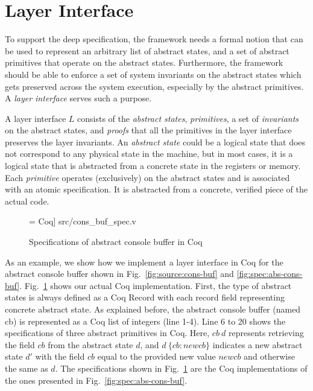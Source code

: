 \section{Layer Interface}
\label{sec:layer_interface}
To support the deep specification, the framework needs a formal notion
that can be used to represent an arbitrary list of abstract states,
and a set of abstract primitives that operate on the abstract states. 
Furthermore, the framework should be able to enforce a set of system
invariants on the abstract states which gets preserved across
the system execution, especially by the abstract primitives.
A {\em layer interface} serves such a purpose.

A layer interface $L$ consists of the {\em abstract states}, {\em
  primitives}, a set of {\em invariants} on the abstract states, and
{\em proofs} that all the primitives in the layer interface preserves
the layer invariants.  An {\em abstract state} could be a logical
state that does not correspond to any physical state in the machine,
but in most cases, it is a logical state that is abstracted from a
concrete state in the registers or memory. Each {\em primitive}
operates (exclusively) on the abstract states and is associated with an atomic
specification. It is abstracted from a concrete, verified piece of the
actual code.  

\begin{figure}
 = Coq] {src/cons_buf_spec.v}
\caption{Specifications of abstract console buffer in Coq}
\label{fig:cons_buf_spec}
\end{figure}

As an example, we show how we implement a layer interface in Coq
for the abstract console buffer shown in Fig.~\ref{fig:source:cons-buf}
and \ref{fig:spec:abs-cons-buf}. Fig.~\ref{fig:cons_buf_spec} shows
our actual Coq implementation. First, the type of abstract states
is always defined as a Coq \textsf{Record} with each record field
representing concrete abstract state.
As explained before, the abstract console buffer (named \textsf{cb})
is represented as a Coq list of integers (line 1-4).
Line 6 to 20 shows the specifications of three abstract primitives
in Coq. Here, $cb~d$ represents retrieving the field $cb$ from the
abstract state $d$, and $d~\{cb: newcb\}$ indicates a new abstract state
$d'$ with the field $cb$ equal to the provided new value $newcb$ and
otherwise the same as $d$. The specifications shown in Fig.~\ref{fig:cons_buf_spec}
are the Coq implementations of the ones presented in Fig.~\ref{fig:spec:abs-cons-buf}.

